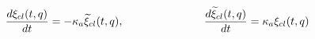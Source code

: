 \begin{equation}
\label{fermiondynamics1classical}
\frac{d\xi_{cl}(t,q)}{dt} = -\kappa_a{\widetilde \xi}_{cl}(t,q),
\hspace{1.0in}
\frac{d{\widetilde \xi}_{cl}(t,q)}{dt} = \kappa_a\xi_{cl}(t,q)
\end{equation}

